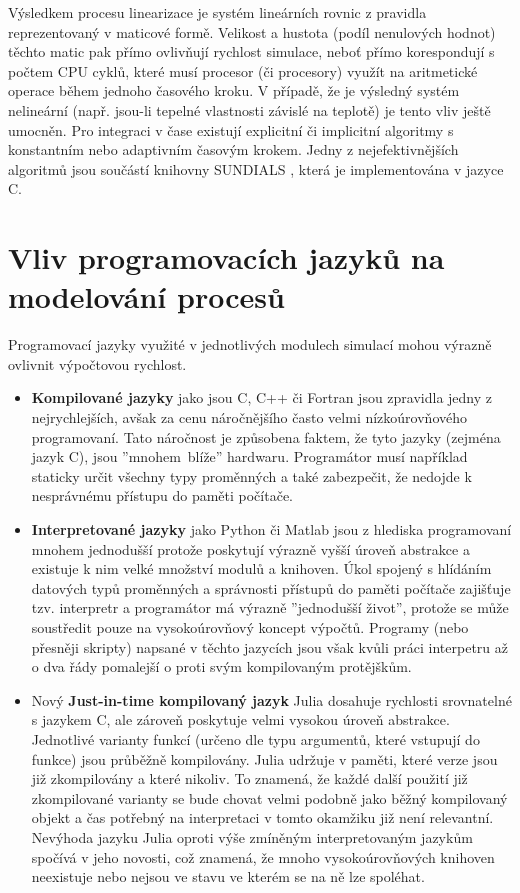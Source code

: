 Výsledkem procesu linearizace je systém lineárních rovnic z pravidla
reprezentovaný v maticové formě. Velikost a hustota (podíl nenulových hodnot)
těchto matic pak přímo ovlivňují rychlost simulace, neboť přímo korespondují s
počtem CPU cyklů, které musí procesor (či procesory) využít na aritmetické
operace během jednoho časového kroku. V případě, že je výsledný systém
nelineární (např. jsou-li tepelné vlastnosti závislé na teplotě) je tento vliv
ještě umocněn. Pro integraci v čase existují explicitní či implicitní algoritmy
s konstantním nebo adaptivním časovým krokem. Jedny z nejefektivnějších
algoritmů jsou součástí knihovny SUNDIALS \cite{sundials}, která je
implementována v jazyce C.

\section{Vliv programovacích jazyků na modelování procesů}
\label{sec:proglang}
Programovací jazyky využité v jednotlivých modulech simulací mohou výrazně
ovlivnit výpočtovou rychlost.
\begin{itemize}
  \item
    \textbf{Kompilované jazyky} jako jsou C, C++ či Fortran jsou zpravidla
    jedny z nejrychlejších, avšak za cenu náročnějšího často velmi
    nízkoúrovňového programovaní. Tato náročnost je způsobena faktem, že tyto
    jazyky (zejména jazyk C), jsou ''mnohem~blíže'' hardwaru. Programátor musí
    například staticky určit všechny typy proměnných a také zabezpečit, že
    nedojde k nesprávnému přístupu do paměti počítače.
  \item
    \textbf{Interpretované jazyky} jako Python či Matlab jsou z hlediska
    programovaní mnohem jednodušší protože poskytují výrazně vyšší úroveň
    abstrakce a existuje k nim velké množství modulů a knihoven. Úkol spojený s
    hlídáním datových typů proměnných a správnosti přístupů do paměti počítače
    zajišťuje tzv. interpretr a programátor má výrazně ''jednodušší život'',
    protože se může soustředit pouze na vysokoúrovňový koncept výpočtů.
    Programy (nebo přesněji skripty) napsané v těchto jazycích jsou však kvůli
    práci interpetru až o dva řády pomalejší o proti svým kompilovaným
    protějškům.
  \item
    Nový \textbf{Just-in-time kompilovaný jazyk} Julia \cite{julia2017}
    dosahuje rychlosti srovnatelné s jazykem C, ale zároveň poskytuje velmi
    vysokou úroveň abstrakce. Jednotlivé varianty funkcí (určeno dle typu
    argumentů, které vstupují do funkce) jsou průběžně kompilovány. Julia
    udržuje v paměti, které verze jsou již zkompilovány a které nikoliv.
    To znamená, že každé další použití již zkompilované varianty se bude chovat
    velmi podobně jako běžný kompilovaný objekt a čas potřebný na interpretaci
    v tomto okamžiku již není relevantní. Nevýhoda jazyku Julia oproti výše
    zmíněným interpretovaným jazykům spočívá v jeho novosti, což znamená, že
    mnoho vysokoúrovňových knihoven neexistuje nebo nejsou ve stavu ve kterém
    se na ně lze spoléhat.
\end{itemize}
